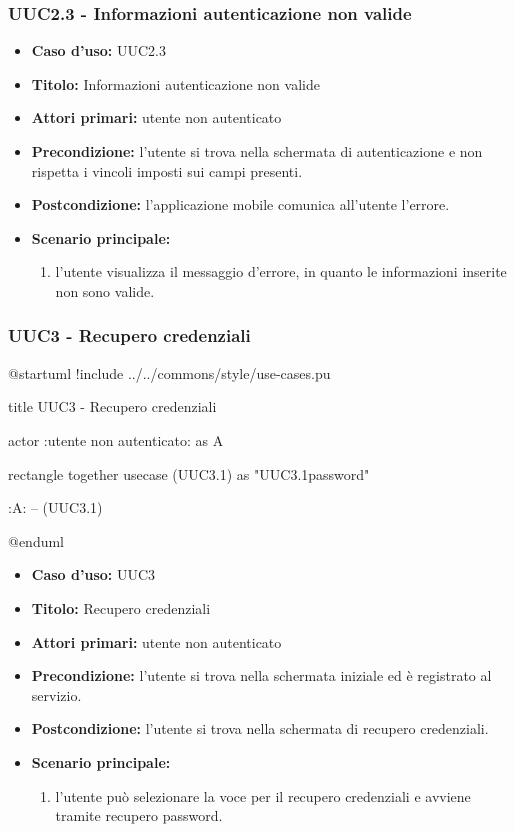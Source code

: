 \documentclass[casi-duso]{subfiles}
\begin{document}
\subsubsection{UUC2.3 - Informazioni autenticazione non valide}%
\label{subsub:UUC2.3utente}
\begin{itemize}
  \item \textbf{Caso d’uso:} UUC2.3
  \item \textbf{Titolo:} Informazioni autenticazione non valide
  \item \textbf{Attori primari:} utente non autenticato
  \item \textbf{Precondizione:} l'utente si trova nella schermata di autenticazione e non rispetta i vincoli imposti sui campi presenti.
  \item \textbf{Postcondizione:} l'applicazione mobile comunica all'utente l'errore.
  \item \textbf{Scenario principale:}
        \begin{enumerate}
          \item l'utente visualizza il messaggio d'errore, in quanto le informazioni inserite non sono valide.
        \end{enumerate}
\end{itemize}

\subsubsection{UUC3 - Recupero credenziali}%
\label{subsub:UUC3utente}

\begin{plantuml}
@startuml
!include ../../commons/style/use-cases.pu

title UUC3 - Recupero credenziali

actor :utente non autenticato: as A

rectangle {
  together {
    usecase (UUC3.1) as "UUC3.1\nRecupero password" 
  }
}

:A: -- (UUC3.1)

@enduml
\end{plantuml}

\begin{itemize}
  \item \textbf{Caso d’uso:} UUC3
  \item \textbf{Titolo:} Recupero credenziali
  \item \textbf{Attori primari:} utente non autenticato
  \item \textbf{Precondizione:} l'utente si trova nella schermata iniziale ed è registrato al servizio.
  \item \textbf{Postcondizione:} l'utente si trova nella schermata di recupero credenziali.
  \item \textbf{Scenario principale:}
        \begin{enumerate}
          \item l'utente può selezionare la voce per il recupero credenziali e avviene tramite recupero password.
        \end{enumerate}
\end{itemize}
\end{document}
